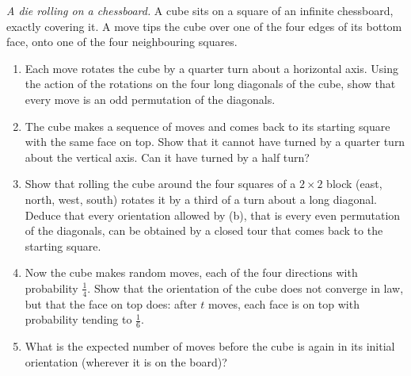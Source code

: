 \begin{exercise}[$\star\star$]\label{pb:rollingdie}
\emph{A die rolling on a chessboard.} A cube sits on a square of an infinite chessboard, exactly covering it. A move tips the cube
over one of the four edges of its bottom face, onto one of the four neighbouring squares.
\begin{enumerate}[label=(\alph*)]
\item Each move rotates the cube by a quarter turn about a horizontal axis. Using the action of the rotations on the four long
diagonals of the cube, show that every move is an odd permutation of the diagonals.
\item The cube makes a sequence of moves and comes back to its starting square with the same face on top. Show that it cannot
have turned by a quarter turn about the vertical axis. Can it have turned by a half turn?
\item Show that rolling the cube around the four squares of a $2\times2$ block (east, north, west, south) rotates it by a third
of a turn about a long diagonal. Deduce that every orientation allowed by (b), that is every even permutation of the
diagonals, can be obtained by a closed tour that comes back to the starting square.
\item Now the cube makes random moves, each of the four directions with probability $\frac14$. Show that the orientation of the cube
does not converge in law, but that the face on top does: after $t$ moves, each face is on top with probability tending to $\frac16$.
\item What is the expected number of moves before the cube is again in its initial orientation (wherever it is on the board)?
\end{enumerate}
\end{exercise}

